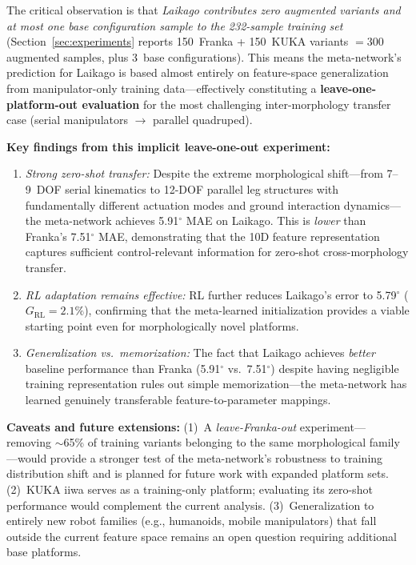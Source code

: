 \documentclass[DTMColor]{ROB-New}
\begin{document}
{\color{blue}The critical observation is that \textit{Laikago contributes zero augmented variants and at most one base configuration sample to the 232-sample training set} (Section~\ref{sec:experiments} reports 150~Franka + 150~KUKA variants $= 300$ augmented samples, plus 3~base configurations). This means the meta-network's prediction for Laikago is based almost entirely on feature-space generalization from manipulator-only training data---effectively constituting a \textbf{leave-one-platform-out evaluation} for the most challenging inter-morphology transfer case (serial manipulators $\rightarrow$ parallel quadruped).

\textbf{Key findings from this implicit leave-one-out experiment:}
\begin{enumerate}
    \item \textit{Strong zero-shot transfer:} Despite the extreme morphological shift---from 7--9~DOF serial kinematics to 12-DOF parallel leg structures with fundamentally different actuation modes and ground interaction dynamics---the meta-network achieves 5.91$^\circ$ MAE on Laikago. This is \textit{lower} than Franka's 7.51$^\circ$ MAE, demonstrating that the 10D feature representation captures sufficient control-relevant information for zero-shot cross-morphology transfer.
    \item \textit{RL adaptation remains effective:} RL further reduces Laikago's error to 5.79$^\circ$ ($G_{\mathrm{RL}}=2.1\%$), confirming that the meta-learned initialization provides a viable starting point even for morphologically novel platforms.
    \item \textit{Generalization vs.\ memorization:} The fact that Laikago achieves \textit{better} baseline performance than Franka (5.91$^\circ$ vs.\ 7.51$^\circ$) despite having negligible training representation rules out simple memorization---the meta-network has learned genuinely transferable feature-to-parameter mappings.
\end{enumerate}

\textbf{Caveats and future extensions:} (1)~A \textit{leave-Franka-out} experiment---removing $\sim$65\% of training variants belonging to the same morphological family---would provide a stronger test of the meta-network's robustness to training distribution shift and is planned for future work with expanded platform sets. (2)~KUKA iiwa serves as a training-only platform; evaluating its zero-shot performance would complement the current analysis. (3)~Generalization to entirely new robot families (e.g., humanoids, mobile manipulators) that fall outside the current feature space remains an open question requiring additional base platforms.
}
\end{document}
